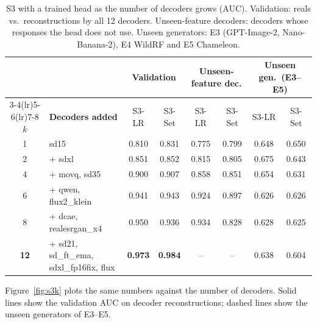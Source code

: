 \begin{table}[H]
\centering
\footnotesize
\caption{S3 with a trained head as the number of decoders grows (AUC). Validation: reals vs.\ reconstructions by all 12 decoders. Unseen-feature decoders: decoders whose responses the head does not use. Unseen generators: E3 (GPT-Image-2, Nano-Banana-2), E4 WildRF and E5 Chameleon.}
\label{tab:s3k}
\setlength{\tabcolsep}{4pt}
\begin{tabular}{c >{\raggedright\arraybackslash}p{3.4cm} cc cc cc}
\toprule
& & \multicolumn{2}{c}{\textbf{Validation}} & \multicolumn{2}{c}{\textbf{Unseen-feature dec.}} & \multicolumn{2}{c}{\textbf{Unseen gen.\ (E3--E5)}} \\
\cmidrule(lr){3-4}\cmidrule(lr){5-6}\cmidrule(lr){7-8}
$k$ & \textbf{Decoders added} & S3-LR & S3-Set & S3-LR & S3-Set & S3-LR & S3-Set \\
\midrule
1 & sd15 & 0.810 & 0.831 & 0.775 & 0.799 & 0.648 & 0.650 \\
2 & + sdxl & 0.851 & 0.852 & 0.815 & 0.805 & 0.675 & 0.643 \\
4 & + movq, sd35 & 0.900 & 0.907 & 0.858 & 0.851 & 0.654 & 0.631 \\
6 & + qwen, flux2\_klein & 0.941 & 0.943 & 0.924 & 0.897 & 0.626 & 0.626 \\
8 & + dcae, realesrgan\_x4 & 0.950 & 0.936 & 0.934 & 0.828 & 0.628 & 0.625 \\
\textbf{12} & + sd21, sd\_ft\_ema, sdxl\_fp16fix, flux & \textbf{0.973} & \textbf{0.984} & -- & -- & 0.638 & 0.604 \\
\bottomrule
\end{tabular}
\end{table}

Figure~\ref{fig:s3k} plots the same numbers against the number of decoders. Solid lines show the validation AUC on decoder reconstructions; dashed lines show the unseen generators of E3--E5.

